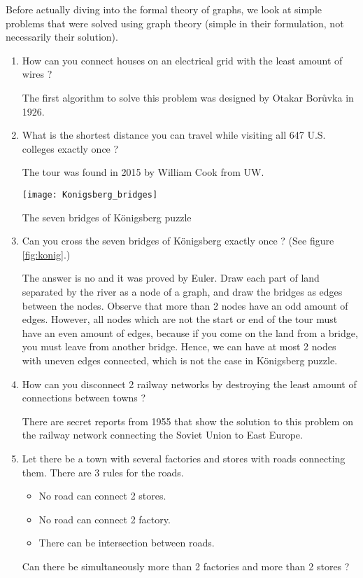 \documentclass{tufte-handout}
\theoremstyle{definition}
\theoremstyle{remark}
\begin{document}
Before actually diving into the formal theory of graphs, we look at simple problems that were solved using graph theory (simple in their formulation, not necessarily their solution).

\begin{enumerate}
	\item How can you connect houses on an electrical grid with the least amount of wires ?
	
	The first algorithm to solve this problem was designed by Otakar Bor\r{u}vka in 1926.
	
	\item What is the shortest distance you can travel while visiting all 647 U.S. colleges exactly once ?
	
	The tour was found in 2015 by William Cook from UW.
	
	\begin{marginfigure}
		\centering
		\texttt{[image: Konigsberg\_bridges]}
		\caption{The seven bridges of K\"onigsberg puzzle}
		\label{fig:konig}
	\end{marginfigure}
	\item Can you cross the seven bridges of K\"onigsberg exactly once ? (See figure \ref{fig:konig}.)
	
	The answer is no and it was proved by Euler. Draw each part of land separated by the river as a node of a graph, and draw the bridges as edges between the nodes. Observe that more than 2 nodes have an odd amount of edges. However, all nodes which are not the start or end of the tour must have an even amount of edges, because if you come on the land from a bridge, you must leave from another bridge. Hence, we can have at most 2 nodes with uneven edges connected, which is not the case in K\"onigsberg puzzle.
	
	\item How can you disconnect 2 railway networks by destroying the least amount of connections between towns ?
	
	There are secret reports from 1955 that show the solution to this problem on the railway network connecting the Soviet Union to East Europe.
	
	\item Let there be a town with several factories and stores with roads connecting them. There are 3 rules for the roads.
	\begin{itemize}
		\item No road can connect 2 stores.
		\item No road can connect 2 factory.
		\item There can be intersection between roads.
	\end{itemize}
	Can there be simultaneously more than 2 factories and more than 2 stores ?
	

\end{enumerate}
\end{document}
